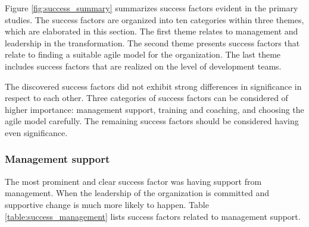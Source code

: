 \documentclass[preprint,authoryear,12pt]{elsarticle}
\begin{document}
Figure \ref{fig:success_summary} summarizes success factors evident in the
primary studies. The success factors are organized into ten categories within
three themes, which are elaborated in this section. The first theme relates to
management and leadership in the transformation. The second theme presents
success factors that relate to finding a suitable agile model for the
organization. The last theme includes success factors that are realized on the
level of development teams.

The discovered success factors did not exhibit strong differences in
significance in respect to each other. Three categories of success factors can
be considered of higher importance: management support, training and coaching,
and choosing the agile model carefully. The remaining success factors should be
considered having even significance.

% 
% 
% 


\subsubsection{Management support}

The most prominent and clear success factor was having support from management.
When the leadership of the organization is committed and supportive change is
much more likely to happen. Table \ref{table:success_management} lists
success factors related to management support.
\end{document}
